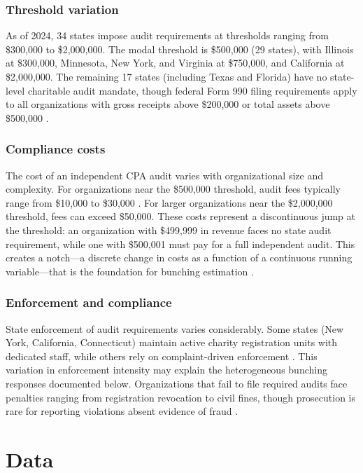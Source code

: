 \documentclass[12pt]{article}
\begin{document}
\subsubsection*{Threshold variation} As of 2024, 34 states impose audit requirements at thresholds ranging from \$300,000 to \$2,000,000. The modal threshold is \$500,000 (29 states), with Illinois at \$300,000, Minnesota, New York, and Virginia at \$750,000, and California at \$2,000,000. The remaining 17 states (including Texas and Florida) have no state-level charitable audit mandate, though federal Form 990 filing requirements apply to all organizations with gross receipts above \$200,000 or total assets above \$500,000 \citep{IRS2024}.

\subsubsection*{Compliance costs} The cost of an independent CPA audit varies with organizational size and complexity. For organizations near the \$500,000 threshold, audit fees typically range from \$10,000 to \$30,000 \citep{AICPA2020}. For larger organizations near the \$2,000,000 threshold, fees can exceed \$50,000. These costs represent a discontinuous jump at the threshold: an organization with \$499,999 in revenue faces no state audit requirement, while one with \$500,001 must pay for a full independent audit. This creates a notch---a discrete change in costs as a function of a continuous running variable---that is the foundation for bunching estimation \citep{Kleven2013}.

\subsubsection*{Enforcement and compliance} State enforcement of audit requirements varies considerably. Some states (New York, California, Connecticut) maintain active charity registration units with dedicated staff, while others rely on complaint-driven enforcement \citep{Irvin2010}. This variation in enforcement intensity may explain the heterogeneous bunching responses documented below. Organizations that fail to file required audits face penalties ranging from registration revocation to civil fines, though prosecution is rare for reporting violations absent evidence of fraud \citep{Crimm2008}.

\section{Data}
\end{document}
